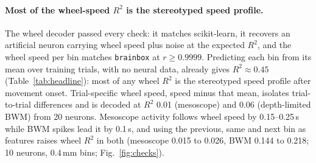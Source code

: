 \documentclass[10pt]{article}
\newcommand{\figref}[1]{Fig.~\ref{fig:#1}}
\begin{document}




\FloatBarrier
\paragraph{Most of the wheel-speed $R^2$ is the stereotyped speed profile.}
The wheel decoder passed every check: it matches scikit-learn, it recovers an artificial neuron carrying wheel speed plus noise at the expected $R^2$, and the wheel speed per bin matches \texttt{brainbox} at $r \geq 0.9999$. Predicting each bin from its mean over training trials, with no neural data, already gives $R^2 \approx 0.45$ (Table~\ref{tab:headline}): most of any wheel $R^2$ is the stereotyped speed profile after movement onset. Trial-specific wheel speed, speed minus that mean, isolates trial-to-trial differences and is decoded at $R^2$ 0.01 (mesoscope) and 0.06 (depth-limited BWM) from 20 neurons. Mesoscope activity follows wheel speed by 0.15--0.25\,s while BWM spikes lead it by 0.1\,s, and using the previous, same and next bin as features raises wheel $R^2$ in both (mesoscope 0.015 to 0.026, BWM 0.144 to 0.218; 10 neurons, 0.4\,mm bins; \figref{checks}).



\FloatBarrier
\end{document}
